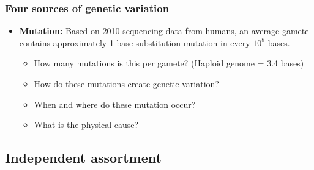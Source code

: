 \begin{frame}[t]
    \frametitle{Four sources of genetic variation}
    \begin{adjustwidth}{-3em}{-1.5em}
        \vspace{-4mm}
        \begin{itemize}
            \item[1.]<2-> \textbf{Mutation:} Based on 2010 sequencing data from humans,
                an average gamete contains approximately 1 base-substitution
                mutation in every $10^8$ bases.

                \begin{itemize}
                    \item<3-> How many mutations is this per gamete? {\scriptsize(Haploid
                        genome = 3.4 bases)}


                    \item<3-> How do these mutations create genetic variation?


                    \item<3-> When and where do these mutation occur?


                    \item<3-> What is the physical cause?

                \end{itemize}
        \end{itemize}

    \end{adjustwidth}
\end{frame}

\subsection{Independent assortment}

